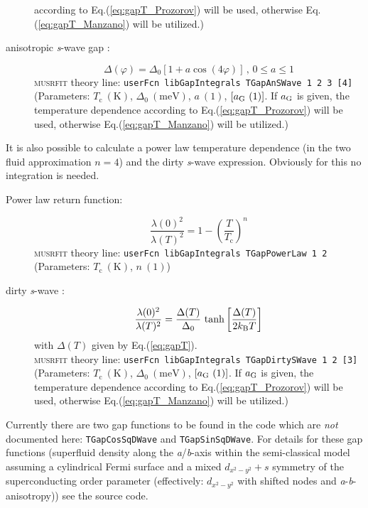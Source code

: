 \documentclass[twoside]{article}
\newcommand{\musrfit}{\textsc{musrfit}\xspace}
\begin{document}
\begin{description}
    according to Eq.(\ref{eq:gapT_Prozorov}) will be used, otherwise Eq.(\ref{eq:gapT_Manzano}) will be utilized.)
 \item[anisotropic \textit{s}-wave gap \cite{AnisotropicSWave}:] 
    \begin{equation}
      \Delta(\varphi) = \Delta_0\left[1+a\cos\left(4\varphi\right)\right]\,,\,0\leqslant a\leqslant1
    \end{equation}
    \musrfit theory line: \verb?userFcn libGapIntegrals TGapAnSWave 1 2 3 [4]?\\
    (Parameters: $T_{\mathrm c}~(\mathrm{K})$, $\Delta_0~(\mathrm{meV})$, $a~(1)$, $[a_{\rm G}~(1)]$. If $a_{\rm G}$ is given, the temperature dependence 
    according to Eq.(\ref{eq:gapT_Prozorov}) will be used, otherwise Eq.(\ref{eq:gapT_Manzano}) will be utilized.)
\end{description}

\noindent It is also possible to calculate a power law temperature dependence (in the two fluid approximation $n=4$) and the dirty \textit{s}-wave expression. 
Obviously for this no integration is needed.
\begin{description}
 \item[Power law return function:] 
   \begin{equation}
     \frac{\lambda(0)^2}{\lambda(T)^2} = 1-\left(\frac{T}{T_{\mathrm c}}\right)^n
   \end{equation}
   \musrfit theory line: \verb?userFcn libGapIntegrals TGapPowerLaw 1 2?\\
   (Parameters: $T_{\mathrm c}~(\mathrm{K})$, $n~(1)$)
 \item[dirty \textit{s}-wave \cite{Tinkham}:]
    \begin{equation}
      \frac{\lambda(0)^2}{\lambda(T)^2} = \frac{\Delta(T)}{\Delta_0}\,\tanh\left[\frac{\Delta(T)}{2 k_{\rm B} T}\right]
    \end{equation}
    with $\Delta(T)$ given by Eq.(\ref{eq:gapT}).\\ 
    \musrfit theory line: \verb?userFcn libGapIntegrals TGapDirtySWave 1 2 [3]?\\
    (Parameters: $T_{\mathrm c}~(\mathrm{K})$, $\Delta_0~(\mathrm{meV})$, $[a_{\rm G}~(1)]$. If $a_{\rm G}$ is given, the temperature dependence 
    according to Eq.(\ref{eq:gapT_Prozorov}) will be used, otherwise Eq.(\ref{eq:gapT_Manzano}) will be utilized.)
\end{description}

\noindent Currently there are two gap functions to be found in the code which are \emph{not} documented here: 
\verb?TGapCosSqDWave? and \verb?TGapSinSqDWave?. For details for these gap functions (superfluid density along the \textit{a}/\textit{b}-axis
within the semi-classical model assuming a cylindrical Fermi surface and a mixed $d_{x^2-y^2} + s$ symmetry of the superconducting order parameter 
(effectively: $d_{x^2-y^2}$ with shifted nodes and \textit{a}-\textit{b}-anisotropy)) see the source code.
\end{document}
